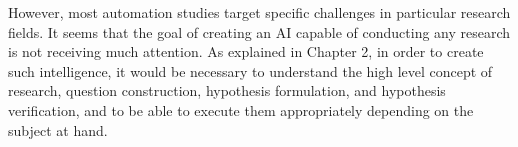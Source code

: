 However, most automation studies target specific challenges in particular research fields. It seems that the goal of creating an AI capable of conducting any research is not receiving much attention. As explained in Chapter 2, in order to create such intelligence, it would be necessary to understand the high level concept of research, question construction, hypothesis formulation, and hypothesis verification, and to be able to execute them appropriately depending on the subject at hand.






